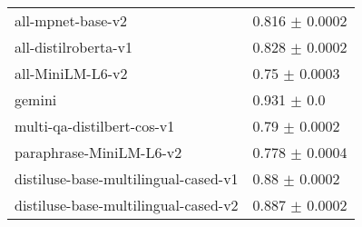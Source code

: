 \begin{table}[h!]
{\begin{tabular}{ll}
                    all-mpnet-base-v2 &                 0.816 $\pm$ 0.0002 \\
                 all-distilroberta-v1 &                 0.828 $\pm$ 0.0002 \\
                     all-MiniLM-L6-v2 &                  0.75 $\pm$ 0.0003 \\
                               gemini &                    0.931 $\pm$ 0.0 \\
           multi-qa-distilbert-cos-v1 &                  0.79 $\pm$ 0.0002 \\
              paraphrase-MiniLM-L6-v2 &                 0.778 $\pm$ 0.0004 \\
 distiluse-base-multilingual-cased-v1 &                  0.88 $\pm$ 0.0002 \\
 distiluse-base-multilingual-cased-v2 &                 0.887 $\pm$ 0.0002 \\

\end{tabular}}
\end{table}
